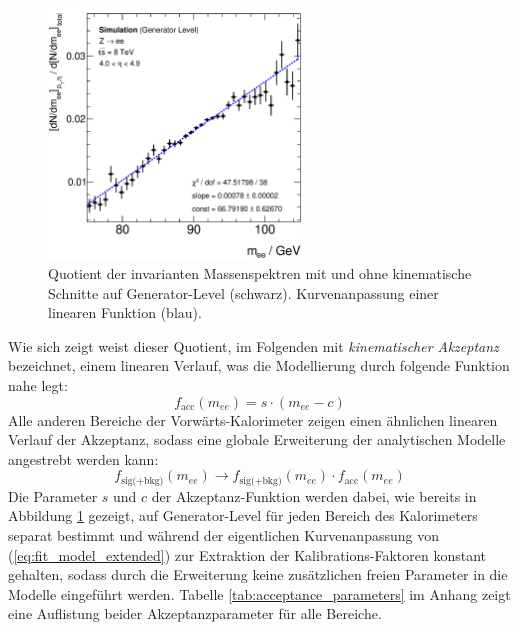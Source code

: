 \begin{figure}
    \centering
    \includegraphics[width=0.6\textwidth]{plots/efficiency_p40}
    \caption[Quotient der invarianten Massenspektren mit und ohne kinematische
        Schnitte auf Generator-Level]
        {Quotient der invarianten Massenspektren mit und ohne kinematische
        Schnitte auf Generator-Level (schwarz). Kurvenanpassung einer linearen
        Funktion (blau).}
    \label{fig:efficiency_p40}
\end{figure}

Wie sich zeigt weist dieser Quotient, im Folgenden mit \textit{kinematischer
Akzeptanz} bezeichnet, einem linearen Verlauf, was die Modellierung durch
folgende Funktion nahe legt:
\begin{equation}
    f_\text{acc}(m_{ee}) = s \cdot (m_{ee}-c)
    \label{eq:acceptance}
\end{equation}
Alle anderen Bereiche der Vorwärts-Kalorimeter zeigen einen ähnlichen linearen
Verlauf der Akzeptanz, sodass eine globale Erweiterung der analytischen Modelle
angestrebt werden kann:
\begin{equation}
    f_\text{sig(+bkg)}(m_{ee}) \longrightarrow f_\text{sig(+bkg)}(m_{ee})
    \cdot f_\text{acc}(m_{ee})
    \label{eq:fit_model_extended}
\end{equation}
Die Parameter $s$ und $c$ der Akzeptanz-Funktion werden dabei, wie bereits in
Abbildung \ref{fig:efficiency_p40} gezeigt, auf Generator-Level für jeden
Bereich des Kalorimeters separat bestimmt und während der eigentlichen
Kurvenanpassung von (\ref{eq:fit_model_extended}) zur Extraktion der
Kalibrations-Faktoren konstant gehalten, sodass durch die Erweiterung keine
zusätzlichen freien Parameter in die Modelle eingeführt werden. Tabelle
\ref{tab:acceptance_parameters} im Anhang zeigt eine Auflistung beider
Akzeptanzparameter für alle Bereiche.

